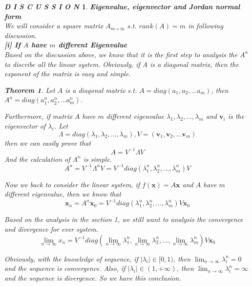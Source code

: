 \documentclass[12pt]{article}
\theoremstyle{plain}
\newtheorem{theorem}{\textbf{Theorem}}[section]
\newtheorem{discussion}{\textit{D I S C U S S I O N}}[section]
\begin{document}
\begin{discussion}\textbf{Eigenvalue, eigenvector and Jordan normal form}
\\\noindent * We will consider a square matrix $A_{m\times m}$ s.t. $rank(A) = m$ in following discussion.\\[1ex]


  \noindent \textbf{[i] If $A$ have $m$ different Eigenvalue} 
\\\noindent Based on the discussion above, we know that it is the first step to analysis the $A^n$ to discribe all the linear system. Obviously, if A is a diagonal matrix, then the exponent of the matrix is easy and simple. 

\begin{theorem} Let $A$ is a diagonal matrix s.t. $A = diag(a_1, a_2, \ldots a_m)$, then $A^n = diag(a_1^n, a_2^n, \ldots a_m^n)$.
\end{theorem}

Furthermore, if matrix $A$ have $m$ different eigenvalue $\lambda_1, \lambda_2, \ldots, \lambda_m$ and $\mathbf v_i$ is the eigenvector of $\lambda_i$. Let
$$
\Lambda = diag(\lambda_1, \lambda_2, \ldots, \lambda_m), V = (\mathbf v_1, \mathbf v_2, \ldots \mathbf v_m)
$$
then we can easily prove that 
$$
A = V^{-1} \Lambda V
$$
And the calculation of $A^n$ is simple.
$$
A^n = V^{-1} \Lambda^n V = V^{-1} diag(\lambda_1^n, \lambda_2^n, \ldots, \lambda_m^n) V
$$

Now we back to consider the linear system, if $f(\mathbf x )= A \mathbf x$ and $A$ have $m$ different eigenvalue, then we know that 
$$
\mathbf x_{n} = A^n \mathbf x_0 = V^{-1} diag(\lambda_1^n, \lambda_2^n, \ldots, \lambda_m^n) V \mathbf x_0
$$

Based on the analysis in the section 1, we still want to analysis the convergence and divergence for ever system.
$$
\lim_{n \rightarrow \infty} x_{n} = V^{-1} diag(\lim_{n \rightarrow \infty}\lambda_1^n, \lim_{n \rightarrow \infty}\lambda_2^n, \ldots, \lim_{n \rightarrow \infty}\lambda_m^n) V \mathbf x_0
$$

Obviously, with the knowledge of sequence, if $|\lambda_i| \in [0, 1)$, then $\lim_{n \rightarrow \infty}\lambda_i^n = 0$ and the sequence is convergence. Also, if $|\lambda_i| \in (1, +\infty)$, then $\lim_{n \rightarrow \infty}\lambda_i^n = \infty$ and the sequence is divergence. So we have this conclusion.



\end{discussion}
\end{document}
